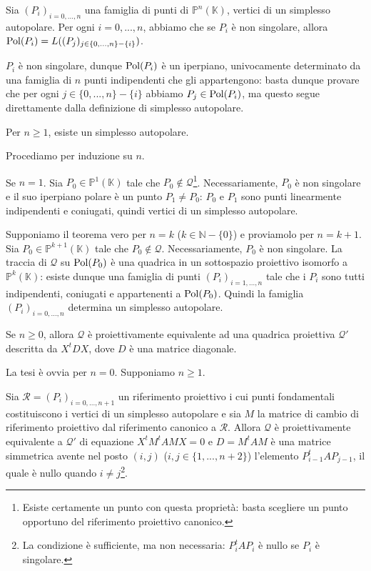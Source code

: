 \begin{Theorem}\label{th61}
	Sia $(P_i)_{i = 0, ..., n}$ una famiglia di punti di $\mathbb{P}^n(\mathbb{K})$, vertici di un simplesso autopolare. Per ogni $i = 0, ..., n$, abbiamo che se $P_i$ \`e non singolare, allora $\operatorname{Pol}(P_i) = L((P_j)_{j \in \lbrace 0, ..., n \rbrace - \lbrace i \rbrace})$.
\end{Theorem}
\Proof $P_i$ \`e non singolare, dunque $\operatorname{Pol}(P_i)$ \`e un iperpiano, univocamente determinato da una famiglia di $n$ punti indipendenti che gli appartengono: basta dunque provare che per ogni $j \in \lbrace 0, ..., n \rbrace - \lbrace i \rbrace$ abbiamo $P_j \in \operatorname{Pol}(P_i)$, ma questo segue direttamente dalla definizione di simplesso autopolare. \EndProof
\begin{Theorem}\label{th62}
	Per $n \geq 1$, esiste un simplesso autopolare.
\end{Theorem}
\Proof Procediamo per induzione su $n$.
	\par Se $n = 1$. Sia $P_0 \in \mathbb{P}^1(\mathbb{K})$ tale che $P_0 \notin \mathcal{Q}$\footnote{Esiste certamente un punto con questa propriet\`a: basta scegliere un punto opportuno del riferimento proiettivo canonico.}. Necessariamente, $P_0$ \`e non singolare e il suo iperpiano polare \`e un punto $P_1 \neq P_0$: $P_0$ e $P_1$ sono punti linearmente indipendenti e coniugati, quindi vertici di un simplesso autopolare.
	\par Supponiamo il teorema vero per $n = k$ ($k \in \mathbb{N} - \lbrace 0 \rbrace$) e proviamolo per $n = k + 1$. Sia $P_0 \in \mathbb{P}^{k + 1}(\mathbb{K})$ tale che $P_0 \notin \mathcal{Q}$. Necessariamente, $P_0$ \`e non singolare. La traccia di $\mathcal{Q}$ su $\operatorname{Pol}(P_0)$ \`e una quadrica in un sottospazio proiettivo isomorfo a $\mathbb{P}^k(\mathbb{K})$: esiste dunque una famiglia di punti $(P_i)_{i = 1, ..., n}$ tale che i $P_i$ sono tutti indipendenti, coniugati e appartenenti a $\operatorname{Pol}(P_0)$. Quindi la famiglia $(P_i)_{i = 0, ..., n}$ determina un simplesso autopolare. \EndProof
\begin{Theorem}\label{th63}
	Se $n \geq 0$, allora $\mathcal{Q}$ \`e proiettivamente equivalente ad una quadrica proiettiva $\mathcal{Q}'$ descritta da $X^tDX$, dove $D$ \`e una matrice diagonale.
\end{Theorem}
\Proof La tesi \`e ovvia per $n = 0$. Supponiamo $n \geq 1$.
	\par Sia $\mathcal{R} = (P_i)_{i = 0, ..., n + 1}$ un riferimento proiettivo i cui punti fondamentali costituiscono i vertici di un simplesso autopolare e sia $M$ la matrice di cambio di riferimento proiettivo dal riferimento canonico a $\mathcal{R}$. Allora $\mathcal{Q}$ \`e proiettivamente equivalente a $\mathcal{Q}'$ di equazione $X^tM^tAMX = 0$ e $D = M^tAM$ \`e una matrice simmetrica avente nel posto $(i,j)$ ($i,j \in \lbrace 1, ..., n + 2 \rbrace$) l'elemento $P_{i - 1}^tAP_{j - 1}$, il quale \`e nullo quando $i \neq j$\footnote{La condizione \`e sufficiente, ma non necessaria: $P_i^tAP_i$ \`e nullo se $P_i$ \`e singolare.}. \EndProof
